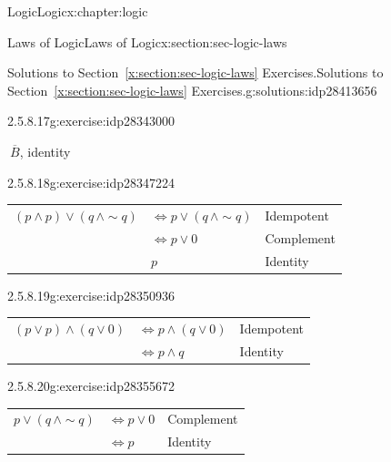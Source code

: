 \documentclass[twoside,10pt,]{book}
\newcommand{\tabularfont}{\relax}
\newcommand{\xreffont}{\relax}
\numberwithin{equation}{section}
\begin{document}
\begin{chapterptx}{Logic}{}{Logic}{}{}{x:chapter:logic}
\begin{sectionptx}{Laws of Logic}{}{Laws of Logic}{}{}{x:section:sec-logic-laws}
\begin{solutions-subsection}{Solutions to Section~{\xreffont\ref*{x:section:sec-logic-laws}} Exercises.}{}{Solutions to Section~{\xreffont\ref*{x:section:sec-logic-laws}} Exercises.}{}{}{g:solutions:idp28413656}
\begin{exercisegroup}
\begin{divisionsolutioneg}{2.5.8.17}{}{g:exercise:idp28343000}
\par\smallskip%
\noindent\hypertarget{g:solution:idp28346200-main}{}\(\ \overline{B}\), identity\end{divisionsolutioneg}%
\end{exercisegroup}
\par\medskip\noindent
\begin{exercisegroup}
\begin{divisionsolutioneg}{2.5.8.18}{}{g:exercise:idp28347224}%
\par\smallskip%
\noindent\hypertarget{g:solution:idp28342616-main}{}\begin{center}%
{\tabularfont%
\begin{tabular}{lll}
\multicolumn{1}{c}{\((p{\wedge} p){\vee}(q\,{\wedge}\sim\!{q})\)}&\(\Leftrightarrow p{\vee}(q\,{\wedge}\sim\!{q})\)&Idempotent\tabularnewline[0pt]
&\(\Leftrightarrow p{\vee} 0\)&Complement\tabularnewline[0pt]
&\(p\)&Identity
\end{tabular}
}%
\end{center}%
\end{divisionsolutioneg}%
\begin{divisionsolutioneg}{2.5.8.19}{}{g:exercise:idp28350936}%
\par\smallskip%
\noindent\hypertarget{g:solution:idp28353496-main}{}\begin{center}%
{\tabularfont%
\begin{tabular}{lll}
\multicolumn{1}{c}{\((p{\vee} p){\wedge}(q{\vee} 0)\)}&\(\Leftrightarrow p{\wedge}(q{\vee} 0)\)&Idempotent\tabularnewline[0pt]
&\(\Leftrightarrow p{\wedge} q\)&Identity
\end{tabular}
}%
\end{center}%
\end{divisionsolutioneg}%
\begin{divisionsolutioneg}{2.5.8.20}{}{g:exercise:idp28355672}%
\par\smallskip%
\noindent\hypertarget{g:solution:idp28356056-main}{}\begin{center}%
{\tabularfont%
\begin{tabular}{lll}
\multicolumn{1}{c}{\(p{\vee}(q\,{\wedge}\sim\!{q})\)}&\(\Leftrightarrow p{\vee} 0\)&Complement\tabularnewline[0pt]
&\(\Leftrightarrow p\)&Identity
\end{tabular}
}%
\end{center}%
\end{divisionsolutioneg}%
\end{exercisegroup}
\par\medskip\noindent

\end{solutions-subsection}
\end{sectionptx}
\end{chapterptx}
\end{document}
